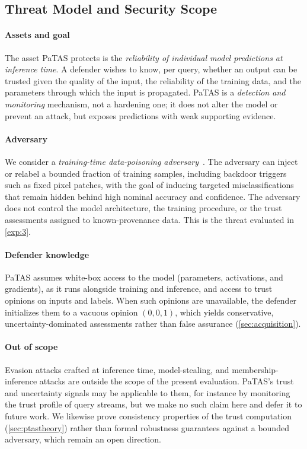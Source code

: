 \vspace{-0.5em}
\subsection{Threat Model and Security Scope}\label{sec:threat}
\vspace{-0.5em}

\paragraph*{Assets and goal}
The asset PaTAS protects is the \emph{reliability of individual model predictions at inference time}. A defender wishes to know, per query, whether an output can be trusted given the quality of the input, the reliability of the training data, and the parameters through which the input is propagated. PaTAS is a \emph{detection and monitoring} mechanism, not a hardening one; it does not alter the model or prevent an attack, but exposes predictions with weak supporting evidence.

\paragraph*{Adversary}
We consider a \emph{training-time data-poisoning adversary}~\cite{chen2017targetedbackdoorattacksdeep}. The adversary can inject or relabel a bounded fraction of training samples, including backdoor triggers such as fixed pixel patches, with the goal of inducing targeted misclassifications that remain hidden behind high nominal accuracy and confidence. The adversary does not control the model architecture, the training procedure, or the trust assessments assigned to known-provenance data. This is the threat evaluated in \cref{exp:3}.

\paragraph*{Defender knowledge}
PaTAS assumes white-box access to the model (parameters, activations, and gradients), as it runs alongside training and inference, and access to trust opinions on inputs and labels. When such opinions are unavailable, the defender initializes them to a vacuous opinion \((0,0,1)\), which yields conservative, uncertainty-dominated assessments rather than false assurance (\cref{sec:acquisition}).

\paragraph*{Out of scope}
Evasion attacks crafted at inference time, model-stealing, and membership-inference attacks are outside the scope of the present evaluation. PaTAS's trust and uncertainty signals may be applicable to them, for instance by monitoring the trust profile of query streams, but we make no such claim here and defer it to future work. We likewise prove consistency properties of the trust computation (\cref{sec:ptastheory}) rather than formal robustness guarantees against a bounded adversary, which remain an open direction.

